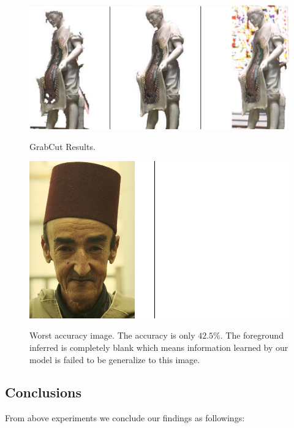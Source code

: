 \begin{figure}[t]
  \begin{center} \setlength{\tabcolsep}{0pt}
    \includegraphics[width=\linewidth]{Experiments/figures/24077.png}\\
  \caption{\label{fig:portrait_results} GrabCut Results.}
  \end{center}
\end{figure}

\begin{figure}[t]
  \begin{center} \setlength{\tabcolsep}{0pt}
    \includegraphics[width=0.5\linewidth]{Experiments/figures/189080.png}
\\
\caption{\label{fig:grabcut_worst} Worst accuracy image. The
  accuracy is only $42.5\%$. The foreground inferred is
  completely blank which means information learned by our model
  is failed to be generalize to this image.}
  \end{center}
\end{figure}

\clearpage

\subsection{Conclusions}
\label{sec:grabcut-conc}

From above experiments we conclude our findings as followings:

